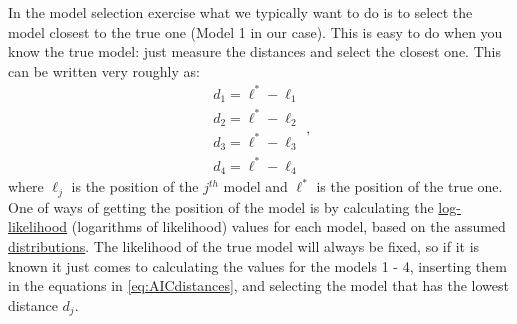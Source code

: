 \documentclass[
]{book}
\theoremstyle{definition}
\theoremstyle{definition}
\theoremstyle{definition}
\theoremstyle{definition}
\theoremstyle{remark}
\begin{document}
In the model selection exercise what we typically want to do is to select the model closest to the true one (Model 1 in our case). This is easy to do when you know the true model: just measure the distances and select the closest one. This can be written very roughly as:
\begin{equation}
    \begin{split}
        d_1 = \ell^* - \ell_1 \\
        d_2 = \ell^* - \ell_2 \\
        d_3 = \ell^* - \ell_3 \\
        d_4 = \ell^* - \ell_4
    \end{split} ,
    \label{eq:AICdistances}
\end{equation}
where \(\ell_j\) is the position of the \(j^{th}\) model and \(\ell^*\) is the position of the true one. One of ways of getting the position of the model is by calculating the \protect\hyperlink{likelihoodApproach}{log-likelihood} (logarithms of likelihood) values for each model, based on the assumed \protect\hyperlink{distributions}{distributions}. The likelihood of the true model will always be fixed, so if it is known it just comes to calculating the values for the models 1 - 4, inserting them in the equations in \eqref{eq:AICdistances}, and selecting the model that has the lowest distance \(d_j\).
\end{document}
